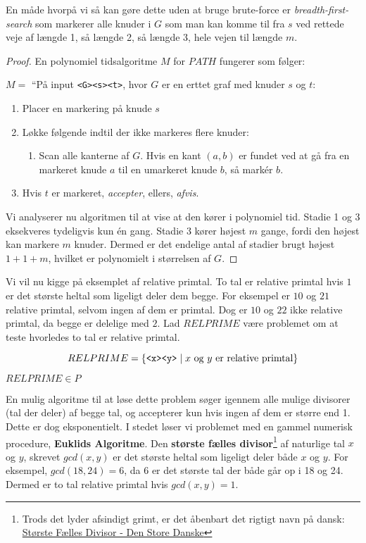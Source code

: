 En måde hvorpå vi så kan gøre dette uden at bruge brute-force er \textit{breadth-first-search} som markerer alle knuder i $G$ som man kan komme til fra $s$ ved rettede veje af længde 1, så længde 2, så længde 3, hele vejen til længde $m$.

\begin{proof}
	En polynomiel tidsalgoritme $M$ for $PATH$ fungerer som følger:

	$M =$ ``På input \texttt{<G><s><t>}, hvor $G$ er en erttet graf med knuder $s$ og $t$:
	\begin{enumerate}
		\item Placer en markering på knude $s$
		\item Løkke følgende indtil der ikke markeres flere knuder:
		      \begin{enumerate}
			      \item Scan alle kanterne af $G$. Hvis en kant $(a,b)$ er fundet ved at gå fra en markeret knude $a$ til en umarkeret knude $b$, så markér $b$.
		      \end{enumerate}
		\item Hvis $t$ er markeret, \textit{accepter}, ellers, \textit{afvis}.
	\end{enumerate}

	Vi analyserer nu algoritmen til at vise at den kører i polynomiel tid. Stadie 1 og 3 eksekveres tydeligvis kun én gang. Stadie 3 kører højest $m$ gange, fordi den højest kan markere $m$ knuder. Dermed er det endelige antal af stadier brugt højest $1 + 1 + m$, hvilket er polynomielt i størrelsen af $G$.
\end{proof}

Vi vil nu kigge på eksemplet af relative primtal. To tal er relative primtal hvis $1$ er det største heltal som ligeligt deler dem begge. For eksempel er $10$ og $21$ relative primtal, selvom ingen af dem er primtal. Dog er $10$ og $22$ ikke relative primtal, da begge er delelige med $2$. Lad $RELPRIME$ være problemet om at teste hvorledes to tal er relative primtal.

\begin{equation*}
	RELPRIME = \{\text{\texttt{<x><y>}} \mid x \text{ og } y \text{ er relative primtal}\}
\end{equation*}

\begin{theorem}
	$RELPRIME \in P$
\end{theorem}

En mulig algoritme til at løse dette problem søger igennem alle mulige divisorer (tal der deler) af begge tal, og accepterer kun hvis ingen af dem er større end 1. Dette er dog eksponentielt. I stedet løser vi problemet med en gammel numerisk procedure, \textbf{Euklids Algoritme}. Den \textbf{største fælles divisor}\footnote{Trods det lyder afsindigt grimt, er det åbenbart det rigtigt navn på dansk: \href{https://denstoredanske.lex.dk/st\%C3\%B8rste_f\%C3\%A6lles_divisor}{Største Fælles Divisor - Den Store Danske}} af naturlige tal $x$ og $y$, skrevet $gcd(x,y)$ er det største heltal som ligeligt deler både $x$ og $y$. For eksempel, $gcd(18,24) = 6$, da $6$ er det største tal der både går op i 18 og 24. Dermed er to tal relative primtal hvis $gcd(x,y) = 1$.

